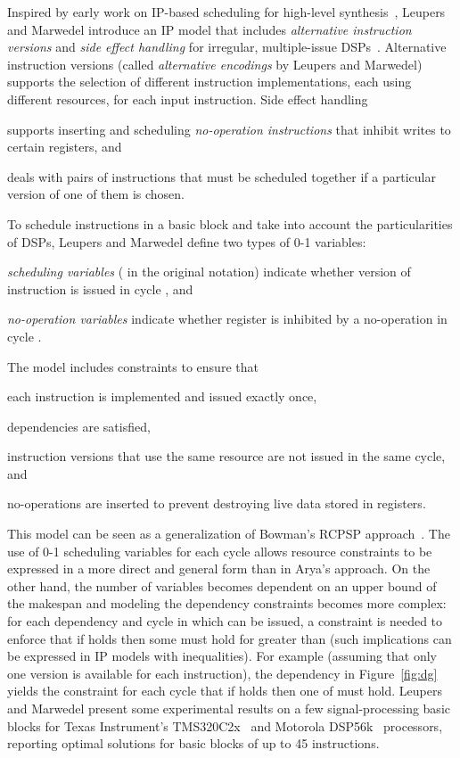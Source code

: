 \documentclass[acmsmall,authorversion,nonacm]{acmart}
\newcommand{\var}[2]{}
\begin{document}
Inspired by early work on IP-based scheduling for high-level
synthesis~\cite{Hwang1991,Gebotys1991}, Leupers and Marwedel introduce
an IP model that includes \emph{alternative instruction versions} and
\emph{side effect handling} for irregular, multiple-issue
DSPs~\cite{Leupers1997}.
Alternative instruction versions (called \emph{alternative encodings}
by Leupers and Marwedel) supports the selection of different
instruction implementations, each using different resources, for each
input instruction.
Side effect handling
\begin{inparaitem}[]
\item supports inserting and scheduling \emph{no-operation
  instructions} that inhibit writes to certain registers, and
\item deals with pairs of instructions that must be scheduled together
  if a particular version of one of them is chosen.
\end{inparaitem}
To schedule instructions in a basic block and take into account the
particularities of DSPs, Leupers and Marwedel define two types of 0-1
variables:
\begin{inparaitem}[]
\item \emph{scheduling variables} \var{s}{v,i,k} ( in the
  original notation) indicate whether version  of instruction 
  is issued in cycle , and
\item \emph{no-operation variables} \var{n}{r,k} indicate whether
  register  is inhibited by a no-operation in cycle .
\end{inparaitem}
The model includes constraints to ensure that
\begin{inparaitem}[]
\item each instruction is implemented and issued exactly once,
\item dependencies are satisfied,
\item instruction versions that use the same resource are not issued
  in the same cycle, and
\item no-operations are inserted to prevent destroying live data
  stored in registers.
\end{inparaitem}
This model can be seen as a generalization of Bowman's RCPSP
approach~\cite{Bowman1959}.
The use of 0-1 scheduling variables for each cycle allows resource
constraints to be expressed in a more direct and general form than in
Arya's approach.
On the other hand, the number of variables becomes dependent on an
upper bound of the makespan and modeling the dependency constraints
becomes more complex: for each dependency  and cycle
 in which  can be issued, a constraint is needed to enforce that
if \var{s}{v,i,k} holds then some \var{s}{v',j,l} must hold for 
greater than  (such implications can be expressed in IP models with
inequalities).
For example (assuming that only one version  is available for
each instruction), the dependency  in Figure~\ref{fig:dg} yields the constraint for each
cycle  that if  holds then one
of  must hold.
Leupers and Marwedel present some experimental results on a few
signal-processing basic blocks for Texas Instrument's TMS320C2x~\cite{C2x} and
Motorola DSP56k~\cite{Kloker1987} processors, reporting optimal
solutions for basic blocks of up to 45 instructions.
\end{document}
